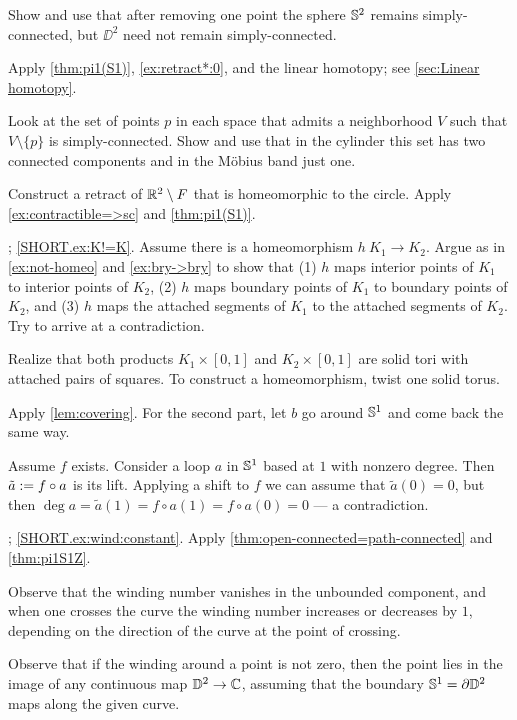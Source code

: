  Show and use that after removing one point the sphere $\mathbb{S}^2$ remains simply-connected, but $\DD^2$ need not remain simply-connected.

 Apply \ref{thm:pi1(S1)}, \ref{ex:retract*:0}, and the linear homotopy; see \ref{sec:Linear homotopy}.


Look at the set of points $p$ in each space that admits a neighborhood $V$ such that $V\setminus \{p\}$ is simply-connected.
Show and use that in the cylinder this set has two connected components and in the Möbius band just one.


Construct a retract of $\mathbb{R}^2\setminus F$ that is homeomorphic to the circle.
Apply \ref{ex:contractible=>sc} and \ref{thm:pi1(S1)}.

\parbf{\ref{ex:KK}}; \ref{SHORT.ex:K!=K}.
Assume there is a homeomorphism $h\:K_1\to K_2$.
Argue as in \ref{ex:not-homeo} and \ref{ex:bry->bry} to show that
(1) $h$ maps interior points of $K_1$ to interior points of $K_2$,
(2) $h$ maps boundary points of $K_1$ to boundary points of $K_2$,
and (3) $h$ maps the attached segments of $K_1$ to the attached segments of $K_2$.
Try to arrive at a contradiction.

Realize that both products $K_1\times [0,1]$ and $K_2\times [0,1]$ are solid tori with attached pairs of squares.
To construct a homeomorphism, twist one solid torus.

Apply \ref{lem:covering}.
For the second part, let $b$ go around $\mathbb{S}^1$ and come back the same way.

Assume $f$ exists.
Consider a loop $a$ in $\mathbb{S}^1$ based at $1$ with nonzero degree.
Then $\tilde a\mathrel{:=} f\circ a$ is its lift.
Applying a shift to $f$ we can assume that $\tilde a(0)=0$,
but then $\deg a=\tilde a(1)=f\circ a(1)=f\circ a(0)=0$ --- a contradiction.

\parbf{\ref{ex:wind}}; \ref{SHORT.ex:wind:constant}.
Apply \ref{thm:open-connected=path-connected} and \ref{thm:pi1S1Z}.

Observe that the winding number vanishes in the unbounded component,
and when one crosses the curve the winding number increases or decreases by $1$, depending on the direction of the curve at the point of crossing.

Observe that if the winding around a point is not zero, then the point lies in the image of any continuous map $\mathbb{D}^2\to\mathbb{C}$, assuming that the boundary $\mathbb{S}^1=\partial\mathbb{D}^2$ maps along the given curve.

